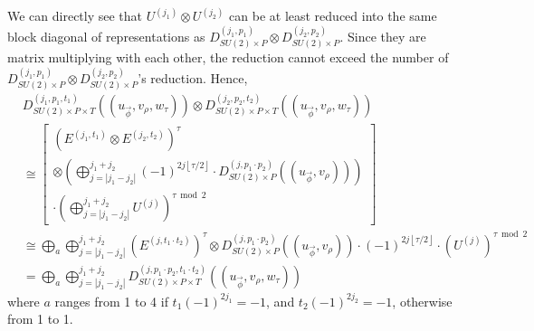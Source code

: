 \documentclass[preprint, 12pt]{revtex4-2}
\numberwithin{equation}{section}
\begin{document}
We can directly see that $U^{(j_1)}\otimes U^{(j_2)}$ can be at least reduced into the same block diagonal of representations as $D_{SU(2)\times P}^{(j_1,p_1)}\otimes D_{SU(2)\times P}^{(j_2,p_2)}$. Since they are matrix multiplying with each other, the reduction cannot exceed the number of $D_{SU(2)\times P}^{(j_1,p_1)}\otimes D_{SU(2)\times P}^{(j_2,p_2)}$'s reduction. Hence,
\begin{equation}
    \begin{aligned}
        &D^{(j_1,p_1,t_1)}_{SU(2)\times P\times T}((u_{\vec{\phi}}, v_\rho, w_\tau))\otimes D^{(j_2,p_2,t_2)}_{SU(2)\times P\times T}((u_{\vec{\phi}}, v_\rho, w_\tau)) \\
        &\cong  \left[\begin{multlined}
                    \left(E^{(j_1,t_1)}\otimes E^{(j_2,t_2)}\right)^\tau\\
                    \otimes\left(\bigoplus_{j=|j_1-j_2|}^{j_1+j_2}(-1)^{2j\left\lfloor \tau/2\right\rfloor}\cdot D_{SU(2)\times P}^{(j,p_1\cdot p_2)}((u_{\vec{\phi}}, v_\rho))\right)\\
                    \cdot\left(\bigoplus_{j=|j_1-j_2|}^{j_1+j_2}U^{(j)}\right)^{\tau\bmod 2}
                \end{multlined}\right] \\
        &\cong  \bigoplus_a\bigoplus_{j=|j_1-j_2|}^{j_1+j_2}\left(E^{(j,t_1\cdot t_2)}\right)^\tau\otimes D_{SU(2)\times P}^{(j,p_1\cdot p_2)}((u_{\vec{\phi}}, v_\rho))\cdot(-1)^{2j\left\lfloor \tau/2\right\rfloor}\cdot\left(U^{(j)}\right)^{\tau\bmod 2} \\
        &= \bigoplus_a\bigoplus_{j=|j_1-j_2|}^{j_1+j_2} D^{(j,p_1\cdot p_2,t_1\cdot t_2)}_{SU(2)\times P\times T}((u_{\vec{\phi}}, v_\rho, w_\tau))
    \end{aligned}
\end{equation}
where $a$ ranges from 1 to 4 if $t_1(-1)^{2j_1}=-1$, and $t_2(-1)^{2j_2}=-1$, otherwise from 1 to 1.
\end{document}

